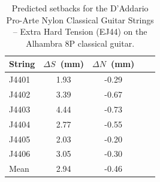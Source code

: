  \begin{table}[htbp]
  \centering
  \caption{\label{tbl:ej44_setbacks} Predicted setbacks for the D'Addario Pro-Arte Nylon Classical Guitar Strings -- Extra Hard Tension (EJ44) on the Alhambra 8P classical guitar.}
    \begin{tabular}{lcccc}
    \hline \hline
    String  & $\Delta S$~(mm) & $\Delta N$~(mm) \\
    \hline
    J4401 & 1.93 & -0.29 \\
    J4402 & 3.39 & -0.67 \\
    J4403 & 4.44 & -0.73 \\
    J4404 & 2.77 & -0.55 \\
    J4405 & 2.03 & -0.20 \\
    J4406 & 3.05 & -0.30 \\
    \hline \hline
    Mean & 2.94 & -0.46 \\
    \hline
    \end{tabular}%
 \end{table}%

